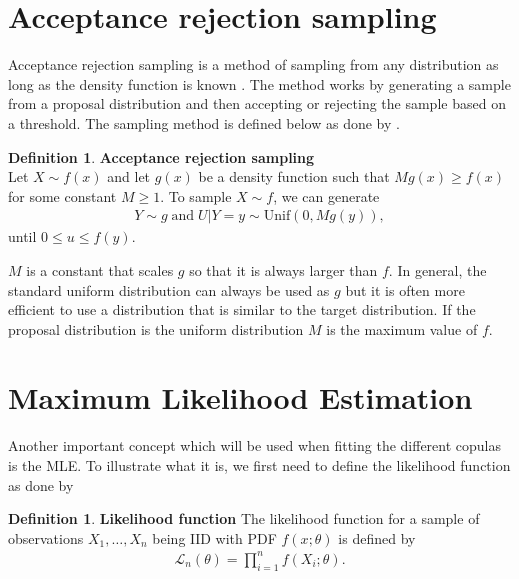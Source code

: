 \documentclass[%
a4paper,							
11pt,								
bibliography=totoc,						
abstracton=true					
]
{scrartcl}
\theoremstyle{plain}
\theoremstyle{definition}
\newtheorem{definition}[theorem]{Definition}
\theoremstyle{remark}
\newcommand{\1}{\mathbbm{1}}
\begin{document}

\section{Acceptance rejection sampling}\label{sec:AcceptanceRejection} 
Acceptance rejection sampling is a method of sampling from any distribution as long as the density function is known . The method works by generating a sample from a proposal distribution and then accepting or rejecting the sample based on a threshold. The sampling method is defined below as done by .

\begin{definition}
    \textbf{Acceptance rejection sampling}\\
    Let $X \sim f(x)$ and let $g(x)$ be a density function such that $M g(x) \geq f(x)$ for some constant $M \geq 1$. To sample $X \sim f$, we can generate   
    \begin{align*}
        Y \sim g \; \mathrm{and} \; U|Y = y \sim \mathrm{Unif}(0,Mg(y)),      
    \end{align*}
    until $0 \leq u \leq f(y)$.
\end{definition}
$M$ is a constant that scales $g$ so that it is always larger than $f$. In general, the standard uniform distribution can always be used as $g$ but it is often more efficient to use a distribution that is similar to the target distribution. If the proposal distribution is the uniform distribution $M$ is the maximum value of $f$.  




\section{Maximum Likelihood Estimation}\label{sec:MLE}
Another important concept which will be used when fitting the different copulas is the \gls{MLE}. To illustrate what it is, we first need to define the likelihood function as done by 
\begin{definition}
    \textbf{Likelihood function}
    The likelihood function for a sample of observations $X_1,\dots,X_n$ being $\mathrm{IID}$ with \gls{PDF} $f(x;\theta)$ is defined by 
    \begin{align*}
        \mathcal{L}_n(\theta) = \prod_{i=1}^n f(X_i;\theta).
    \end{align*}
\end{definition}
\end{document}

